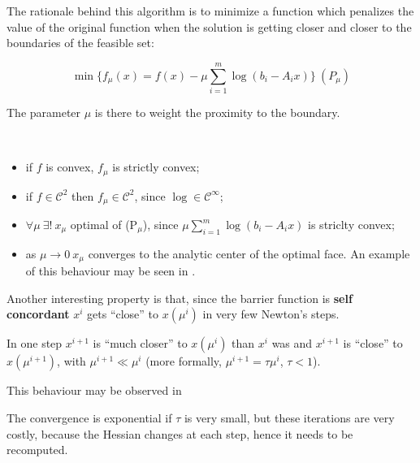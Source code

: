 \documentclass[ComputationalMathematics.tex]{subfiles}
\begin{document}
The rationale behind this algorithm is to minimize a function which penalizes the value of the original function when the solution is getting closer and closer to the boundaries of the feasible set:

\[
  \min \{ f_{\mu}(x) = f(x) - \mu \sum\limits_{i=1}^m \log(b_i - A_i x)\}~(P_{\mu})
\]
 
The parameter $\mu$ is there to weight the proximity to the boundary.

\begin{property}~\\
  \begin{itemize}
    \item if $f$ is convex, $f_\mu$ is strictly convex;
    \item if $f \in \mathcal{C}^2$ then $f_{\mu} \in \mathcal{C}^2$, since $\log \in \mathcal{C}^{\infty}$;
    \item $\forall \mu~ \exists!~x_\mu$ optimal of (P$_{\mu}$), since $\mu \sum\limits_{i=1}^m \log(b_i - A_i x)$ is striclty convex;
    \item as $\mu \to 0 ~ x_{\mu}$ converges to the analytic center of the optimal face. 
      An example of this behaviour may be seen in .
  \end{itemize}
\end{property}


Another interesting property is that, since the barrier function is \textbf{self concordant} $x^i$ gets ``close'' to $x(\mu^i)$ in very few Newton's steps.

In one step $x^{i+1}$ is ``much closer'' to $x(\mu^i)$ than $x^{i}$ was and $x^{i+1}$ is ``close'' to $x(\mu^{i+1})$, with $\mu^{i+1} \ll \mu^i$ (more formally, $\mu^{i+1} = \tau \mu^i$, $\tau < 1$).

This behaviour may be observed in 


The convergence is exponential if $\tau$ is very small, but these iterations are very costly, because the Hessian changes at each step, hence it needs to be recomputed.
\end{document}
